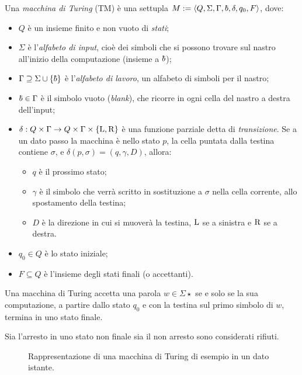 \begin{defin}
	Una \emph{macchina di Turing} (TM) è una settupla $M:=\tuple{Q,\Sigma,\Gamma,\blank,\delta,q_0,F}$, dove:
	\begin{itemize}
		\item $Q$ è un insieme finito e non vuoto di \emph{stati};
		\item $\Sigma$ è l'\emph{alfabeto di input}, cioè dei simboli che si possono trovare sul nastro all'inizio della computazione (insieme a $\blank$);
		\item $\Gamma\supseteq\Sigma\cup\set{\blank}$ è l'\emph{alfabeto di lavoro}, un alfabeto di simboli per il nastro;
		\item $\blank\in\Gamma$ è il simbolo vuoto (\emph{blank}), che ricorre in ogni cella del nastro a destra dell'input;
		\item $\delta:Q\times\Gamma\to Q\times\Gamma\times\left\{ \mathrm L,\mathrm R \right\}$ è una funzione parziale detta di \emph{transizione}. Se a un dato passo la macchina è nello stato $p$, la cella puntata dalla testina contiene $\sigma$, e $\delta(p,\sigma)=(q,\gamma,D)$, allora:
		      \begin{itemize}
			      \item $q$ è il prossimo stato;
			      \item $\gamma$ è il simbolo che verrà scritto in sostituzione a $\sigma$ nella cella corrente, allo spostamento della testina;
			      \item $D$ è la direzione in cui si muoverà la testina, $\mathrm L$ se a sinistra e $\mathrm R$ se a destra.
		      \end{itemize}
		\item $q_0\in Q$ è lo stato iniziale;
		\item $F\subseteq Q$ è l'insieme degli stati finali (o accettanti).
	\end{itemize}
	Una macchina di Turing accetta una parola $w\in\Sigma\star$ se e solo se la sua computazione, a partire dallo stato $q_0$ e con la testina sul primo simbolo di $w$, termina in uno stato finale.
\end{defin}
\noindent Sia l'arresto in uno stato non finale sia il non arresto sono considerati rifiuti.

\begin{figure}
	\centering
	
	\caption{Rappresentazione di una macchina di Turing di esempio in un dato istante.}
\end{figure}

